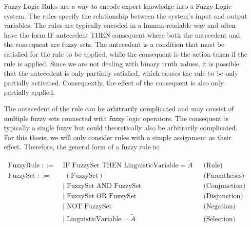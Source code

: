 Fuzzy Logic Rules are a way to encode expert knowledge into a Fuzzy Logic system. The rules specify the relationship between the system's input and output variables.
The rules are typically encoded in a human-readable way and often have the form \emph{$\text{IF} \; \text{antecedent} \; \text{THEN} \; \text{consequent}$} where both the antecedent and the consequent are fuzzy sets. The antecedent is a condition that must be satisfied for the rule to be applied, while the consequent is the action taken if the rule is applied. Since we are not dealing with binary truth values, it is possible that the antecedent is only partially satisfied, which causes the rule to be only partially activated. Consequently, the effect of the consequent is also only partially applied.

The antecedent of the rule can be arbitrarily complicated and may consist of multiple fuzzy sets connected with fuzzy logic operators. The consequent is typically a single fuzzy but could theoretically also be arbitrarily complicated. For this thesis, we will only consider rules with a simple assignment as their effect. Therefore, the general form of a fuzzy rule is:

\newcommand{\fuzzyset}{\langle \text{fuzzy set} \rangle}

\newcommand{\fuzzyrule}{\langle \text{rule} \rangle}

\begin{align*}
      \text{FuzzyRule} \;::=\; & \text{IF } \text{FuzzySet } \text{THEN } \text{LinguisticVariable}=\tilde{A} &  & \text{(Rule)}        \\[10pt]
      \text{FuzzySet} \;::=\;  & \; (\text{FuzzySet})                                                         &  & \text{(Parentheses)} \\
                               & | \;\text{FuzzySet } \text{AND } \text{FuzzySet}                             &  & \text{(Conjunction)} \\
                               & | \;\text{FuzzySet } \text{OR } \text{FuzzySet}                              &  & \text{(Disjunction)} \\
                               & | \;\text{NOT } \text{FuzzySet}                                              &  & \text{(Negation)}    \\
                               & | \;\text{LinguisticVariable} = \tilde{A}                                    &  & \text{(Selection)}
\end{align*}

